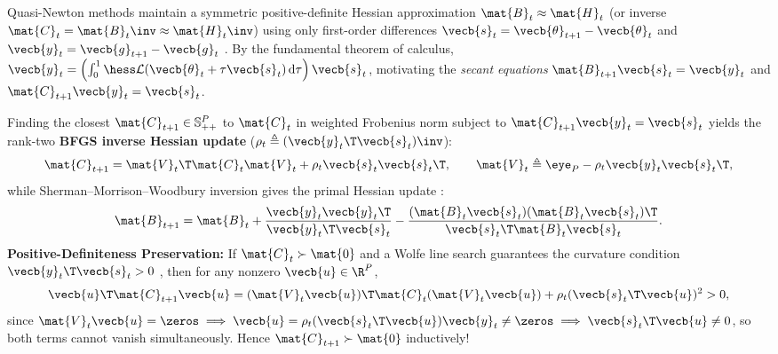 \documentclass[../../../../master.tex]{subfiles}
\begin{document}
\begin{coremath}
\label{thm:optalg:bfgs_lbfgs}
Quasi-Newton methods maintain a symmetric positive-definite Hessian approximation $\mat{B}_t \approx \mat{H}_t$ (or inverse $\mat{C}_t = \mat{B}_t\inv \approx \mat{H}_t\inv$) using only first-order differences $\vecb{s}_t = \vecb{\theta}_{t+1} - \vecb{\theta}_t$ and $\vecb{y}_t = \vecb{g}_{t+1} - \vecb{g}_t$  . By the fundamental theorem of calculus, $\vecb{y}_t = \left(\int_0^1 \hess\mathcal{L}(\vecb{\theta}_t + \tau\vecb{s}_t)\,\mathrm{d}\tau\right)\vecb{s}_t$, motivating the \emph{secant equations} $\mat{B}_{t+1}\vecb{s}_t = \vecb{y}_t$ and $\mat{C}_{t+1}\vecb{y}_t = \vecb{s}_t$.

Finding the closest $\mat{C}_{t+1} \in \mathbb{S}_{++}^P$ to $\mat{C}_t$ in weighted Frobenius norm subject to $\mat{C}_{t+1}\vecb{y}_t = \vecb{s}_t$ yields the rank-two \textbf{BFGS inverse Hessian update} ($\rho_t \triangleq (\vecb{y}_t\T \vecb{s}_t)\inv$):
\begin{equation}
\label{eq:optalg:bfgs_inv}
  \mat{C}_{t+1} = \mat{V}_t\T \mat{C}_t \mat{V}_t + \rho_t \vecb{s}_t \vecb{s}_t\T, \qquad \mat{V}_t \triangleq \eye_P - \rho_t \vecb{y}_t \vecb{s}_t\T,
\end{equation}
while Sherman--Morrison--Woodbury inversion gives the primal Hessian update :
\begin{equation}
\label{eq:optalg:bfgs_primal}
  \mat{B}_{t+1} = \mat{B}_t + \frac{\vecb{y}_t \vecb{y}_t\T}{\vecb{y}_t\T \vecb{s}_t} - \frac{(\mat{B}_t\vecb{s}_t)(\mat{B}_t\vecb{s}_t)\T}{\vecb{s}_t\T \mat{B}_t \vecb{s}_t}.
\end{equation}
\textbf{Positive-Definiteness Preservation:} If $\mat{C}_t \succ \mat{0}$ and a Wolfe line search guarantees the curvature condition $\vecb{y}_t\T \vecb{s}_t > 0$ , then for any nonzero $\vecb{u} \in \R^P$,
\[
  \vecb{u}\T \mat{C}_{t+1}\vecb{u} = (\mat{V}_t\vecb{u})\T \mat{C}_t (\mat{V}_t\vecb{u}) + \rho_t (\vecb{s}_t\T \vecb{u})^2 > 0,
\]
since $\mat{V}_t\vecb{u} = \zeros \implies \vecb{u} = \rho_t(\vecb{s}_t\T\vecb{u})\vecb{y}_t \neq \zeros \implies \vecb{s}_t\T\vecb{u} \neq 0$, so both terms cannot vanish simultaneously. Hence $\mat{C}_{t+1} \succ \mat{0}$ inductively!


\end{coremath}
\end{document}
